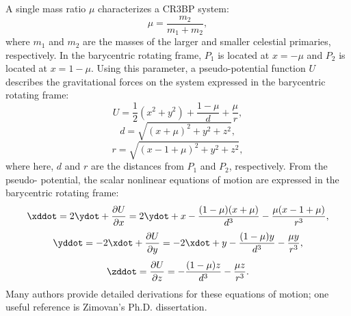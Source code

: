 A single mass ratio $\mu$ characterizes a CR3BP system:
\begin{equation}
    \mu=\frac{m_{2}}{m_{1}+m_{2}},
    \label{eq:mu}
\end{equation}
where $m_{1}$ and $m_{2}$ are the masses of the larger and smaller celestial primaries,
respectively. In the barycentric rotating frame, $P_{1}$ is located at $x=-\mu$ and $P_{2}$ is
located at $x=1-\mu$. Using this parameter, a pseudo-potential function $U$ describes the
gravitational forces on the system expressed in the barycentric rotating frame:
\begin{equation}
    U=\frac{1}{2}(x^{2}+y^{2})+\frac{1-\mu}{d}+\frac{\mu}{r},
    \label{eq:pseud0-potential}
\end{equation}
\begin{equation}
    d=\sqrt{(x+\mu)^{2}+y^{2}+z^{2}},
    \label{eq:P1distance}
\end{equation}
\begin{equation}
    r=\sqrt{(x-1+\mu)^{2}+y^{2}+z^{2}},
    \label{eq:P2distance}
\end{equation}
where here, $d$ and $r$ are the distances from $P_{1}$ and $P_{2}$, respectively. From the pseudo-
potential, the scalar nonlinear equations of motion are expressed in the barycentric rotating
frame:
\begin{equation}
    \xddot=2\ydot+\frac{\partial U}{\partial x}=2\ydot+x-\frac{(1-\mu)(x+\mu)}{d^{3}}-\frac{\mu(x-1+\mu)}{r^{3}},
    \label{eq:EoMx}
\end{equation}
\begin{equation}
    \yddot=-2\xdot+\frac{\partial U}{\partial y}=-2\xdot+y-\frac{(1-\mu)y}{d^{3}}-\frac{\mu y}{r^{3}},
    \label{eq:EoMy}
\end{equation}
\begin{equation}
    \zddot=\frac{\partial U}{\partial z}=-\frac{(1-\mu)z}{d^{3}}-\frac{\mu z}{r^{3}}.
    \label{eq:EoMz}
\end{equation}
Many authors provide detailed derivations for these equations of motion; one useful reference is
Zimovan's Ph.D. dissertation\cite{Zimovan:2017}.

